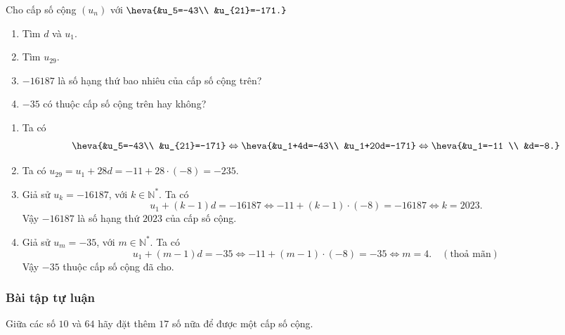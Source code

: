 \begin{vd}[TH]%
	Cho cấp số cộng $(u_n)$ với $\heva{&u_5=-43\\ &u_{21}=-171.}$
	\begin{enumerate}
		\item Tìm $d$ và $u_1$.
		\item Tìm $u_{29}$.
		\item $-16187$ là số hạng thứ bao nhiêu của cấp số cộng trên?
		\item $-35$ có thuộc cấp số cộng trên hay không?		
	\end{enumerate}
	\loigiai
	{
		\begin{enumerate}
			\item Ta có
			\begin{eqnarray*}
				\heva{&u_5=-43\\ &u_{21}=-171} \Leftrightarrow \heva{&u_1+4d=-43\\ &u_1+20d=-171} \Leftrightarrow \heva{&u_1=-11 \\ &d=-8.}
			\end{eqnarray*}
			\item Ta có $u_{29}= u_1+28d= -11+28 \cdot (-8)= -235$.
			\item Giả sử $u_k= -16187$, với $k \in \mathbb{N}^*$. Ta có
			\[
			u_1+ (k-1)d= -16187 \Leftrightarrow -11 + (k-1) \cdot (-8)= -16187 \Leftrightarrow k= 2023.
			\]
			Vậy $-16187$ là số hạng thứ $2023$ của cấp số cộng.
			\item Giả sử $u_m= -35$, với $m\in \mathbb{N}^*$. Ta có
			\[
			u_1+ (m-1) d= -35 \Leftrightarrow -11+ (m-1) \cdot (-8)= -35 \Leftrightarrow m=4. \quad (\text{thoả mãn})
			\]
			Vậy $-35$ thuộc cấp số cộng đã cho.
		\end{enumerate}
	}
\end{vd}

\subsubsection{Bài tập tự luận}
 

\begin{bt}[TH]%
	Giữa các số $10$ và $64$ hãy đặt thêm $17$ số nữa để được một cấp số cộng.
\end{bt}


